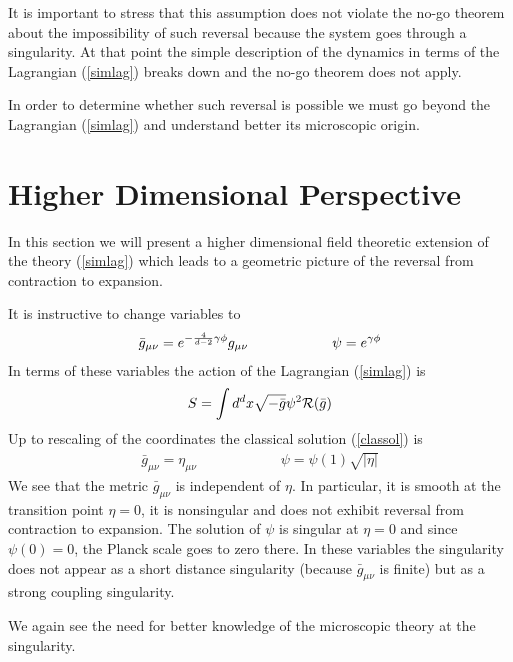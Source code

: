 \documentclass[a4paper,12pt,oneside]{article}
\begin{document}
It is important to stress that this assumption does not violate
the no-go theorem about the impossibility of such reversal
because the system goes through a singularity.  At that point the
simple description of the dynamics in terms of the Lagrangian
(\ref{simlag}) breaks down and the no-go theorem does not apply.

In order to determine whether such reversal is possible we must
go beyond the Lagrangian (\ref{simlag}) and understand better its
microscopic origin.

\setcounter{equation}{0}
\section{Higher Dimensional Perspective}

In this section we will present a higher dimensional field
theoretic extension of the theory (\ref{simlag}) which leads to a
geometric picture of the reversal from contraction to expansion.

It is instructive to change variables to
\begin{eqnarray}
\bar g_{\mu\nu}=e^{-{4\over d-2}\gamma \phi} g_{\mu\nu}
\qquad\qquad\qquad \psi=e^{\gamma\phi}
\end{eqnarray}
In terms of these variables the action of the Lagrangian
(\ref{simlag}) is
\begin{eqnarray}
S=\int d^dx \sqrt{-\bar g} \psi^2{\cal R}(\bar g) \label{dpoac}
\end{eqnarray}
Up to rescaling of the coordinates the classical solution
(\ref{classol}) is
\begin{eqnarray}
\bar g_{\mu\nu}=\eta_{\mu\nu} \qquad\qquad\qquad \psi=\psi(1)
\sqrt{|\eta|}
\end{eqnarray}
We see that the metric $\bar g_{\mu\nu}$ is independent of
$\eta$.  In particular, it is smooth at the transition point
$\eta=0$, it is nonsingular and does not exhibit reversal from
contraction to expansion.  The solution of $\psi$ is singular at
$\eta=0$ and  since $\psi(0)=0$, the Planck scale goes to zero
there.  In these variables the singularity does not appear as a
short distance singularity (because $\bar g_{\mu\nu}$ is finite)
but as a strong coupling singularity.

We again see the need for better knowledge of the microscopic
theory at the singularity.
\end{document}
